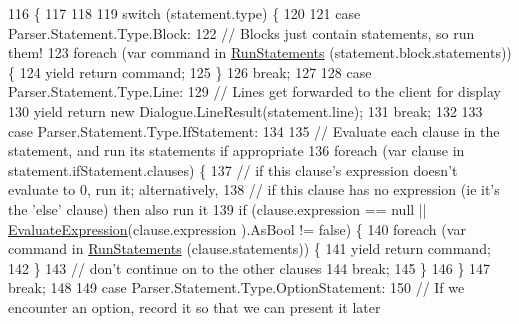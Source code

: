 \begin{DoxyCode}
116                                                                                              \{
117 
118 
119             \textcolor{keywordflow}{switch} (statement.type) \{
120 
121             \textcolor{keywordflow}{case} Parser.Statement.Type.Block:
122                 \textcolor{comment}{// Blocks just contain statements, so run them!}
123                 \textcolor{keywordflow}{foreach} (var command \textcolor{keywordflow}{in} \hyperlink{a00083_aa436557ec45c8e98d194d9af139d9170}{RunStatements} (statement.block.statements)) \{
124                     yield \textcolor{keywordflow}{return} command;
125                 \}
126                 \textcolor{keywordflow}{break};
127 
128             \textcolor{keywordflow}{case} Parser.Statement.Type.Line:
129                 \textcolor{comment}{// Lines get forwarded to the client for display}
130                 yield \textcolor{keywordflow}{return} \textcolor{keyword}{new} Dialogue.LineResult(statement.line);
131                 \textcolor{keywordflow}{break};
132 
133             \textcolor{keywordflow}{case} Parser.Statement.Type.IfStatement:
134 
135                 \textcolor{comment}{// Evaluate each clause in the statement, and run its statements if appropriate}
136                 \textcolor{keywordflow}{foreach} (var clause \textcolor{keywordflow}{in} statement.ifStatement.clauses) \{
137                     \textcolor{comment}{// if this clause's expression doesn't evaluate to 0, run it; alternatively,}
138                     \textcolor{comment}{// if this clause has no expression (ie it's the 'else' clause) then also run it}
139                     \textcolor{keywordflow}{if} (clause.expression == null || \hyperlink{a00083_ac57271c72da4ec456a32c94d951c8b65}{EvaluateExpression}(clause.expression
      ).AsBool != \textcolor{keyword}{false}) \{
140                         \textcolor{keywordflow}{foreach} (var command \textcolor{keywordflow}{in}  \hyperlink{a00083_aa436557ec45c8e98d194d9af139d9170}{RunStatements} (clause.statements)) \{
141                             yield \textcolor{keywordflow}{return} command;
142                         \}
143                         \textcolor{comment}{// don't continue on to the other clauses}
144                         \textcolor{keywordflow}{break};
145                     \}
146                 \}
147                 \textcolor{keywordflow}{break};
148 
149             \textcolor{keywordflow}{case} Parser.Statement.Type.OptionStatement:
150                 \textcolor{comment}{// If we encounter an option, record it so that we can present it later}

\end{DoxyCode}
